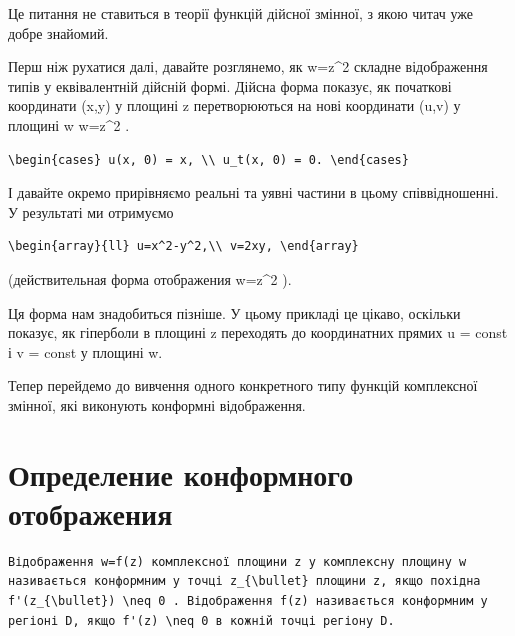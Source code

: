 \documentclass[
  ukrainian,
]{article}
\begin{document}
Це питання не ставиться в теорії функцій дійсної змінної, з якою читач
уже добре знайомий.

Перш ніж рухатися далі, давайте розглянемо, як w=z\^{}2 складне
відображення типів у еквівалентній дійсній формі. Дійсна форма показує,
як початкові координати (x,y) у площині z перетворюються на нові
координати (u,v) у площині w w=z\^{}2 .

\begin{verbatim}
\begin{cases} u(x, 0) = x, \\ u_t(x, 0) = 0. \end{cases}
\end{verbatim}

І давайте окремо прирівняємо реальні та уявні частини в цьому
співвідношенні. У результаті ми отримуємо

\begin{verbatim}
\begin{array}{ll} u=x^2-y^2,\\ v=2xy, \end{array}
\end{verbatim}

(действительная форма отображения w=z\^{}2 ).

Ця форма нам знадобиться пізніше. У цьому прикладі це цікаво, оскільки
показує, як гіперболи в площині z переходять до координатних прямих u =
const і v = const у площині w.

Тепер перейдемо до вивчення одного конкретного типу функцій комплексної
змінної, які виконують конформні відображення.

\section{Определение конформного
отображения}\label{ux43eux43fux440ux435ux434ux435ux43bux435ux43dux438ux435-ux43aux43eux43dux444ux43eux440ux43cux43dux43eux433ux43e-ux43eux442ux43eux431ux440ux430ux436ux435ux43dux438ux44f}

\begin{verbatim}
Відображення w=f(z) комплексної площини z у комплексну площину w називається конформним у точці z_{\bullet} площини z, якщо похідна f'(z_{\bullet}) \neq 0 . Відображення f(z) називається конформним у регіоні D, якщо f'(z) \neq 0 в кожній точці регіону D.
\end{verbatim}
\end{document}
